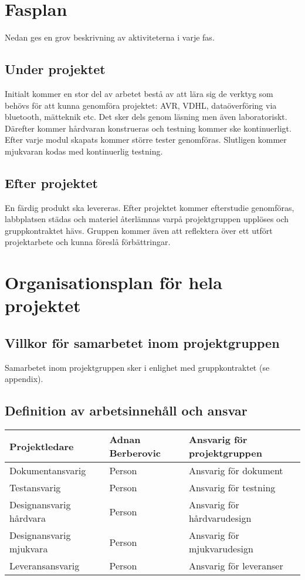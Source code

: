 \documentclass[11pt]{article}
\begin{document}
\begin{flushleft}
\section{Fasplan}
Nedan ges en grov beskrivning av aktiviteterna i varje fas.
\subsection{Under projektet}
Initialt kommer en stor del av arbetet bestå av att lära sig de verktyg som behövs för att kunna genomföra projektet: AVR, VDHL, dataöverföring via bluetooth, mätteknik etc. Det sker dels genom läsning men även laboratoriskt. Därefter kommer hårdvaran konstrueras och testning kommer ske kontinuerligt. Efter varje modul skapats kommer större tester genomföras. Slutligen kommer mjukvaran kodas med kontinuerlig testning.

\subsection{Efter projektet}
En färdig produkt ska levereras. Efter projektet kommer efterstudie genomföras, labbplatsen städas och materiel återlämnas varpå projektgruppen upplöses och gruppkontraktet hävs. Gruppen kommer även att reflektera över ett utfört projektarbete och kunna föreslå förbättringar.
\pagebreak

\section{Organisationsplan för hela projektet} 

\subsection{Villkor för samarbetet inom projektgruppen}
Samarbetet inom projektgruppen sker i enlighet med gruppkontraktet (se appendix).

\subsection{Definition av arbetsinnehåll och ansvar}

\begin{tabu} to 1.05\textwidth { | X[c] | X[c] | X[c] | }
 \hline
 Projektledare & Adnan Berberovic & Ansvarig för projektgruppen \\
 \hline
 Dokumentansvarig & Person & Ansvarig för dokument\\
 \hline
Testansvarig & Person & Ansvarig för testning \\ 
\hline
Designansvarig hårdvara & Person  & Ansvarig för hårdvarudesign\\
\hline
Designansvarig mjukvara & Person  & Ansvarig för mjukvarudesign\\
\hline
Leveransansvarig & Person & Ansvarig för leveranser \\
\hline
 \end{tabu}


\end{flushleft}
\end{document}
